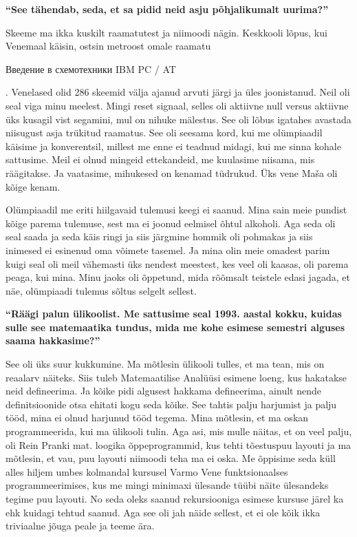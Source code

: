 \textbf{\enquote{See tähendab, seda, et sa pidid neid asju põhjalikumalt uurima?}}

Skeeme ma ikka kuskilt raamatutest ja niimoodi nägin. Keskkooli lõpus, kui Venemaal käisin, ostsin metroost omale raamatu \begin{russian}Введение в схемотехники IBM PC / AT\end{russian}. Venelased olid 286 skeemid välja ajanud arvuti järgi ja üles joonistanud. Neil oli seal viga minu meelest. Mingi reset signaal, selles oli aktiivne null versus aktiivne üks kusagil vist segamini, mul on nihuke mälestus. See oli lõbus igatahes avastada niisugust asja trükitud raamatus. See oli seesama kord, kui me olümpiaadil käisime ja konverentsil, millest me enne ei teadnud midagi, kui me sinna kohale sattusime. Meil ei olnud mingeid ettekandeid, me kuulasime niisama, mis räägitakse. Ja vaatasime, mihukesed on kenamad tüdrukud. Üks vene Maša oli kõige kenam. 

Olümpiaadil me eriti hiilgavaid tulemusi keegi ei saanud. Mina sain meie pundist kõige parema tulemuse, sest ma ei joonud eelmisel õhtul alkoholi. Aga seda oli seal saada ja seda käis ringi ja siis järgmine hommik oli pohmakas ja siis inimesed ei esinenud oma võimete tasemel. Ja mina olin meie omadest parim kuigi seal oli meil vähemasti üks nendest meestest, kes veel oli kaasas, oli parema peaga, kui mina. Minu jaoks oli õppetund, mida rõõmsalt teistele edasi jagada, et näe, olümpiaadi tulemus sõltus selgelt sellest. 

\textbf{\enquote{Räägi palun ülikoolist. Me sattusime seal 1993. aastal kokku, kuidas sulle see matemaatika tundus, mida me kohe esimese semestri alguses saama hakkasime?}}

See oli üks suur kukkumine. Ma mõtlesin ülikooli tulles, et ma tean, mis on reaalarv näiteks. Siis tuleb Matemaatilise Analüüsi esimene loeng, kus hakatakse neid defineerima. Ja kõike pidi algusest hakkama defineerima, ainult nende definitsioonide otsa ehitati kogu seda kõike. See tahtis palju harjumist ja palju tööd, mina ei olnud harjunud tööd tegema. Mina mõtlesin, et ma oskan programmeerida, kui ma ülikooli tulin. Aga asi, mis mulle näitas, et on veel palju, oli Rein Pranki mat. loogika õppeprogrammid, kus tehti tõestuspuu layouti ja ma mõtlesin, et vau, puu layouti niimoodi teha ma ei oska. Me õppisime seda küll alles hiljem umbes kolmandal kursusel Varmo Vene funktsionaalses programmeerimises, kus me mingi minimaxi ülesande tüübi näite ülesandeks tegime puu layouti. No seda oleks saanud rekursiooniga esimese kursuse järel ka ehk kuidagi tehtud saanud. Aga see oli jah näide sellest, et ei ole kõik ikka triviaalne jõuga peale ja teeme ära. 

